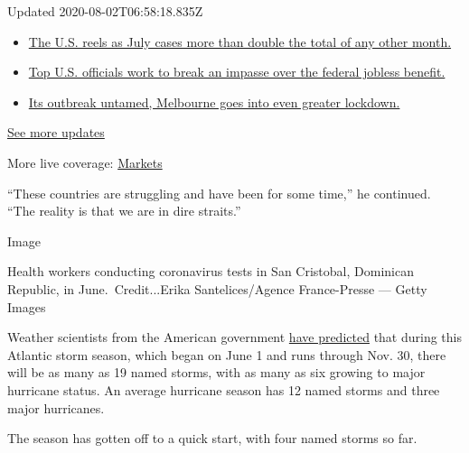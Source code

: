 Updated 2020-08-02T06:58:18.835Z

\begin{itemize}
\tightlist
\item
  \href{https://www.nytimes.com/2020/08/01/world/coronavirus-covid-19.html?action=click\&pgtype=Article\&state=default\&region=MAIN_CONTENT_1\&context=storylines_live_updates\#link-34047410}{The
  U.S. reels as July cases more than double the total of any other
  month.}
\item
  \href{https://www.nytimes.com/2020/08/01/world/coronavirus-covid-19.html?action=click\&pgtype=Article\&state=default\&region=MAIN_CONTENT_1\&context=storylines_live_updates\#link-780ec966}{Top
  U.S. officials work to break an impasse over the federal jobless
  benefit.}
\item
  \href{https://www.nytimes.com/2020/08/01/world/coronavirus-covid-19.html?action=click\&pgtype=Article\&state=default\&region=MAIN_CONTENT_1\&context=storylines_live_updates\#link-2bc8948}{Its
  outbreak untamed, Melbourne goes into even greater lockdown.}
\end{itemize}

\href{https://www.nytimes.com/2020/08/01/world/coronavirus-covid-19.html?action=click\&pgtype=Article\&state=default\&region=MAIN_CONTENT_1\&context=storylines_live_updates}{See
more updates}

More live coverage:
\href{https://www.nytimes.com/live/2020/07/31/business/stock-market-today-coronavirus?action=click\&pgtype=Article\&state=default\&region=MAIN_CONTENT_1\&context=storylines_live_updates}{Markets}

``These countries are struggling and have been for some time,'' he
continued. ``The reality is that we are in dire straits.''

Image

Health workers conducting coronavirus tests in San Cristobal, Dominican
Republic, in June.~Credit...Erika Santelices/Agence France-Presse ---
Getty Images

Weather scientists from the American government
\href{https://www.nytimes.com/2020/05/21/climate/hurricane-season-2020-noaa.html?searchResultPosition=2}{have
predicted} that during this Atlantic storm season, which began on June 1
and runs through Nov. 30, there will be as many as 19 named storms, with
as many as six growing to major hurricane status. An average hurricane
season has 12 named storms and three major hurricanes.

The season has gotten off to a quick start, with four named storms so
far.

